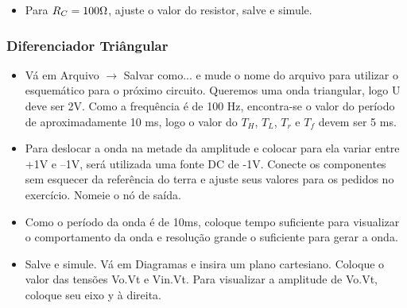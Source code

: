 \begin{itemize}
    \item Para $R_C=100\ohm$, ajuste o valor do resistor, salve e
    simule.
\end{itemize}


\subsubsection{Diferenciador Triângular}

\begin{itemize}
    \item Vá em Arquivo $\rightarrow$ Salvar como... e mude o nome do
    arquivo para utilizar o esquemático para o próximo
    circuito. Queremos uma onda triangular, logo U deve
    ser 2V. Como a frequência é de 100 Hz, encontra-se
    o valor do período de aproximadamente 10 ms, logo
    o valor do $T_H$, $T_L$, $T_r$ e $T_f$ devem ser 5 ms.
\end{itemize}



\begin{itemize}
    \item Para deslocar a onda na metade da amplitude e
    colocar para ela variar entre +1V e –1V, será utilizada
    uma fonte DC de -1V. Conecte os componentes sem
    esquecer da referência do terra e ajuste seus valores
    para os pedidos no exercício. Nomeie o nó de saída.
\end{itemize}


\begin{itemize}
    \item Como o período da onda é de 10ms, coloque tempo
    suficiente para visualizar o comportamento da onda
    e resolução grande o suficiente para gerar a onda.
\end{itemize}


\begin{itemize}
    \item  Salve e simule. Vá em Diagramas e insira um plano
    cartesiano. Coloque o valor das tensões Vo.Vt e
    Vin.Vt. Para visualizar a amplitude de Vo.Vt, coloque
    seu eixo y à direita.
\end{itemize}

